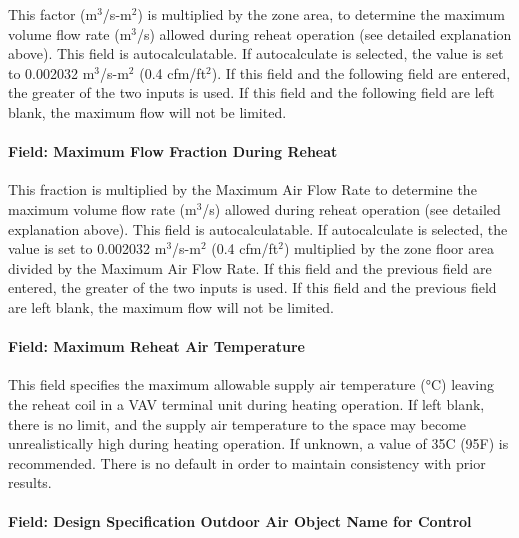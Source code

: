 This factor (m\(^{3}\)/s-m\(^{2}\)) is multiplied by the zone area, to determine the maximum volume flow rate (m\(^{3}\)/s) allowed during reheat operation (see detailed explanation above). This field is autocalculatable. If autocalculate is selected, the value is set to 0.002032 m\(^{3}\)/s-m\(^{2}\) (0.4 cfm/ft\(^{2}\)). If this field and the following field are entered, the greater of the two inputs is used. If this field and the following field are left blank, the maximum flow will not be limited.

\paragraph{Field: Maximum Flow Fraction During Reheat}\label{field-maximum-flow-fraction-during-reheat-000}

This fraction is multiplied by the Maximum Air Flow Rate to determine the maximum volume flow rate (m\(^{3}\)/s) allowed during reheat operation (see detailed explanation above). This field is autocalculatable. If autocalculate is selected, the value is set to 0.002032 m\(^{3}\)/s-m\(^{2}\) (0.4 cfm/ft\(^{2}\)) multiplied by the zone floor area divided by the Maximum Air Flow Rate. If this field and the previous field are entered, the greater of the two inputs is used. If this field and the previous field are left blank, the maximum flow will not be limited.

\paragraph{Field: Maximum Reheat Air Temperature}\label{field-maximum-reheat-air-temperature-000}

This field specifies the maximum allowable supply air temperature (°C) leaving the reheat coil in a VAV terminal unit during heating operation. If left blank, there is no limit, and the supply air temperature to the space may become unrealistically high during heating operation. If unknown, a value of 35C (95F) is recommended. There is no default in order to maintain consistency with prior results.

\paragraph{Field: Design Specification Outdoor Air Object Name for Control}\label{field-design-specification-outdoor-air-object-name-for-control}

